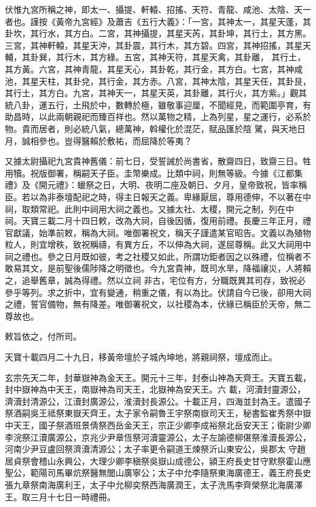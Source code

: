 \begin{pinyinscope}
 伏惟九宮所稱之神，即太一、攝提、軒轅、招搖、天符、青龍、咸池、太陰、天一者也。謹按《黃帝九宮經》及蕭吉《五行大義》：「一宮，其神太一，其星天蓬，其卦坎，其行水，其方白。二宮，其神攝提，其星天芮，其卦坤，其行土，其方黑。三宮，其神軒轅，其星天沖，其卦震，其行木，其方碧。四宮，其神招搖，其星天輔，其卦巽，其行木，其方綠。五宮，其神天符，其星天禽，其卦離，
 其行土，其方黃。六宮，其神青龍，其星天心，其卦乾，其行金，其方白。七宮，其神咸池，其星天柱，其卦兌，其行金，其方赤。八宮，其神太陰，其星天任，其卦艮，其行土，其方白。九宮，其神天一，其星天英，其卦離，其行火，其方紫。」觀其統八卦，運五行，土飛於中，數轉於極，雖敬事迎厘，不聞經見，而範圍亭育，有助昌時，以此兩朝親祀而臻百祥也。然以萬物之精，上為列星，星之運行，必系於物。貴而居者，則必統八氣，總萬神，斡權化於混茫，賦品匯於陰
 騭，與天地日月，誠相參也。豈得醫賴於敷祐，而屈降於等夷？



 又據太尉攝祀九宮貴神舊儀：前七日，受誓誡於尚書省，散齋四日，致齋三日。牲用犢。祝版御署，稱嗣天子臣。圭幣樂成。比類中祠，則無等級。今據《江都集禮》及《開元禮》：蠟祭之日，大明、夜明二座及朝日、夕月，皇帝致祝，皆率稱臣。若以為非泰壇配祀之時，得主日報天之義。卑緣厭屈，尊用德伸，不以著在中祠，取類常祀。此則中祠用大祠之義也。又據太社、太稷，開元之制，列在中
 祠。天寶三載二月十四日敕，改為大祠，自後因循，復用前禮。長慶三年正月，禮官獻議，始準前敕，稱為大祠。唯御署祝文，稱天子謹遣某官昭告。文義以為殖物粒人，則宜增秩，致祝稱禱，有異方丘，不以伸為大祠，遂屈尊稱。此又大祠用中祠之禮也。參之日月既如彼，考之社稷又如此，所謂功鉅者因之以殊禮，位稱者不敢易其文，是前聖後儒陟降之明徵也。今九宮貴神，既司水旱，降福禳災，人將賴之，追舉舊章，誠為得禮。然以立祠
 非古，宅位有方，分職既異其司存，致祝必參乎等列。求之折中，宜有變通，稍重之儀，有以為比。伏請自今已後，卻用大祠之禮，誓官備物，無有降差。唯御署祝文，以社稷為本，伏緣已稱臣於天帝，無二尊故也。



 敕旨依之，付所司。



 天寶十載四月二十九日，移黃帝壇於子城內坤地，將親祠祭，壇成而止。



 玄宗先天二年，封華嶽神為金天王。開元十三年，封泰山神為天齊王。天寶五載，封中嶽神為中天王，南嶽神為司天王，北嶽神為安天王。六
 載，河瀆封靈源公，濟瀆封清源公，江瀆封廣源公，淮瀆封長源公。十載正月，四海並封為王。遣國子祭酒嗣吳王祗祭東嶽天齊王，太子家令嗣魯王宇祭南嶽司天王，秘書監崔秀祭中嶽中天王，國子祭酒班景倩祭西岳金天王，宗正少卿李成裕祭北岳安天王；衛尉少卿李浣祭江瀆廣源公，京兆少尹章恆祭河瀆靈源公，太子左諭德柳偡祭淮瀆長源公，河南少尹豆盧回祭濟瀆清源公；太子率更令嗣道王煉祭沂山東安公，吳郡太
 守趙居貞祭會稽山永興公，大理少卿李稹祭吳嶽山成德公，潁王府長史甘守默祭霍山應聖公，範陽司馬畢炕祭醫無閭山廣寧公；太子中允李隨祭東海廣德王，義王府長史張九章祭南海廣利王，太子中允柳奕祭西海廣潤王，太子洗馬李齊榮祭北海廣澤王。取三月十七日一時禮冊。




\end{pinyinscope}
